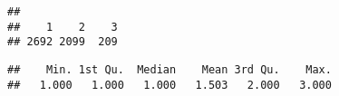 \documentclass[]{article}
\newenvironment{Shaded}{\begin{snugshade}}{\end{snugshade}}
\newcommand{\KeywordTok}[1]{\textcolor[rgb]{0.13,0.29,0.53}{\textbf{#1}}}
\newcommand{\DataTypeTok}[1]{\textcolor[rgb]{0.13,0.29,0.53}{#1}}
\newcommand{\DecValTok}[1]{\textcolor[rgb]{0.00,0.00,0.81}{#1}}
\newcommand{\StringTok}[1]{\textcolor[rgb]{0.31,0.60,0.02}{#1}}
\newcommand{\OperatorTok}[1]{\textcolor[rgb]{0.81,0.36,0.00}{\textbf{#1}}}
\newcommand{\NormalTok}[1]{#1}
\begin{document}
\begin{verbatim}
## 
##    1    2    3 
## 2692 2099  209
\end{verbatim}

\begin{verbatim}
##    Min. 1st Qu.  Median    Mean 3rd Qu.    Max. 
##   1.000   1.000   1.000   1.503   2.000   3.000
\end{verbatim}

\begin{Shaded}
\end{Shaded}
\end{document}
